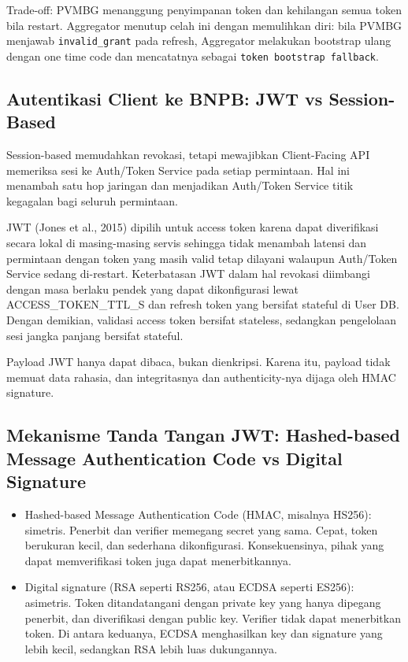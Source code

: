 Trade-off: PVMBG menanggung penyimpanan token dan kehilangan semua token bila restart. Aggregator menutup celah ini dengan memulihkan diri: bila PVMBG menjawab \texttt{invalid\_grant} pada refresh, Aggregator melakukan bootstrap ulang dengan one time code dan mencatatnya sebagai \texttt{token bootstrap fallback}.

\subsection{Autentikasi Client ke BNPB: JWT vs Session-Based}

Session-based memudahkan revokasi, tetapi mewajibkan Client-Facing API memeriksa sesi ke Auth/Token Service pada setiap permintaan. Hal ini menambah satu hop jaringan dan menjadikan Auth/Token Service titik kegagalan bagi seluruh permintaan.

JWT (Jones et al., 2015) dipilih untuk access token karena dapat diverifikasi secara lokal di masing-masing servis sehingga tidak menambah latensi dan permintaan dengan token yang masih valid tetap dilayani walaupun Auth/Token Service sedang di-restart. Keterbatasan JWT dalam hal revokasi diimbangi dengan masa berlaku pendek yang dapat dikonfigurasi lewat ACCESS\_TOKEN\_TTL\_S dan refresh token yang bersifat stateful di User DB. Dengan demikian, validasi access token bersifat stateless, sedangkan pengelolaan sesi jangka panjang bersifat stateful.

Payload JWT hanya dapat dibaca, bukan dienkripsi. Karena itu, payload tidak memuat data rahasia, dan integritasnya dan authenticity-nya dijaga oleh HMAC signature.

\subsection{Mekanisme Tanda Tangan JWT: Hashed-based Message Authentication Code vs Digital Signature}

\begin{itemize}
\tightlist
\item
  Hashed-based Message Authentication Code (HMAC, misalnya HS256): simetris. Penerbit dan verifier memegang secret yang sama. Cepat, token berukuran kecil, dan sederhana dikonfigurasi. Konsekuensinya, pihak yang dapat memverifikasi token juga dapat menerbitkannya.\\
\item
  Digital signature (RSA seperti RS256, atau ECDSA seperti ES256): asimetris. Token ditandatangani dengan private key yang hanya dipegang penerbit, dan diverifikasi dengan public key. Verifier tidak dapat menerbitkan token. Di antara keduanya, ECDSA menghasilkan key dan signature yang lebih kecil, sedangkan RSA lebih luas dukungannya.
\end{itemize}

